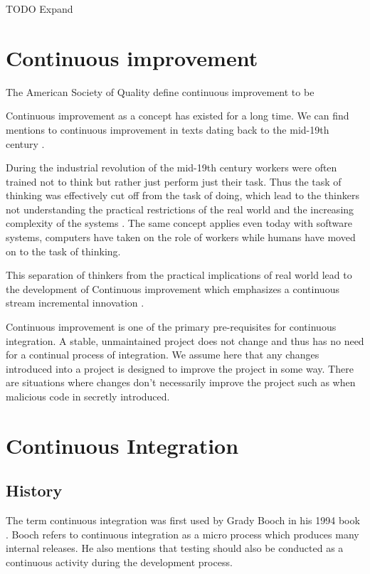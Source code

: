 \documentclass[12pt,conference]{IEEEtran}
\begin{document}
TODO Expand


\section*{Continuous improvement}

The American Society of Quality define continuous improvement to be 
 \cite{american_society_for_quality_continuous_????}

Continuous improvement as a concept has existed for a long time. We can find mentions to continuous improvement in texts dating back to the mid-19th century \cite{schroeder_americas_????}. 

During the industrial revolution of the mid-19th century workers were often trained not to think but rather just perform just their task. Thus the task of thinking was effectively cut off from the task of doing, which lead to the thinkers not understanding the practical restrictions of the real world and the increasing complexity of the systems \cite{schroeder_americas_????}. The same concept applies even today with software systems, computers have taken on the role of workers while humans have moved on to the task of thinking.

This separation of thinkers from the practical implications of real world lead to the development of Continuous improvement which emphasizes a continuous stream incremental innovation \cite{bessant_rediscovering_1994}.

Continuous improvement is one of the primary pre-requisites for continuous integration. A stable, unmaintained project does not change and thus has no need for a continual process of integration. We assume here that any changes introduced into a project is designed to improve the project in some way. There are situations where changes don't necessarily improve the project such as when malicious code in secretly introduced. 


\section*{Continuous Integration}

\subsection*{History}

The term continuous integration was first used by Grady Booch in his 1994 book \cite{booch_object-oriented_1994}. Booch refers to continuous integration as a micro process which produces many internal releases. He also mentions that testing should also be conducted as a continuous activity during the development process.
\end{document}

